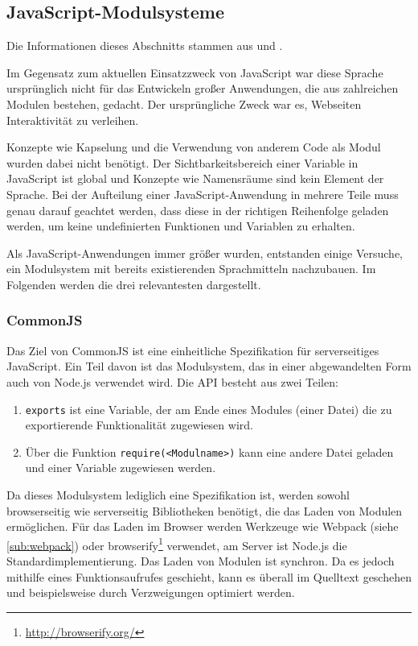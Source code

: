 \subsection{JavaScript-Modulsysteme}
\label{sub:js-modulesystems}
Die Informationen dieses Abschnitts stammen aus \autocite{Osmani.js-modules:online} und \autocite{Peyrott.js-modules:online}.

Im Gegensatz zum aktuellen Einsatzzweck von JavaScript war diese Sprache ursprünglich nicht für das Entwickeln großer Anwendungen, die aus zahlreichen Modulen bestehen, gedacht.
Der ursprüngliche Zweck war es, Webseiten Interaktivität zu verleihen.

Konzepte wie Kapselung und die Verwendung von anderem Code als Modul wurden dabei nicht benötigt.
Der Sichtbarkeitsbereich einer Variable in JavaScript ist global und Konzepte wie Namensräume sind kein Element der Sprache.
Bei der Aufteilung einer JavaScript-Anwendung in mehrere Teile muss genau darauf geachtet werden, dass diese in der richtigen Reihenfolge geladen werden, um keine undefinierten Funktionen und Variablen zu erhalten.

Als JavaScript-Anwendungen immer größer wurden, entstanden einige Versuche, ein Modulsystem mit bereits existierenden Sprachmitteln nachzubauen. Im Folgenden werden die drei relevantesten dargestellt.

\subsubsection{CommonJS}
\label{sub:commonjs}
Das Ziel von CommonJS ist eine einheitliche Spezifikation für serverseitiges JavaScript.
Ein Teil davon ist das Modulsystem, das in einer abgewandelten Form auch von Node.js verwendet wird.
Die API besteht aus zwei Teilen:
\begin{enumerate}
    \item \verb|exports| ist eine Variable, der am Ende eines Modules (einer Datei) die zu exportierende Funktionalität zugewiesen wird.
    \item Über die Funktion \verb|require(<Modulname>)| kann eine andere Datei geladen und einer Variable zugewiesen werden.
\end{enumerate}
Da dieses Modulsystem lediglich eine Spezifikation ist, werden sowohl browserseitig wie serverseitig Bibliotheken benötigt, die das Laden von Modulen ermöglichen.
Für das Laden im Browser werden Werkzeuge wie Webpack (siehe \cref{sub:webpack}) oder browserify\footnote{\url{http://browserify.org/}} verwendet, am Server ist Node.js die Standardimplementierung.
Das Laden von Modulen ist synchron.
Da es jedoch mithilfe eines Funktionsaufrufes geschieht, kann es überall im Quelltext geschehen und beispielsweise durch Verzweigungen optimiert werden. 


